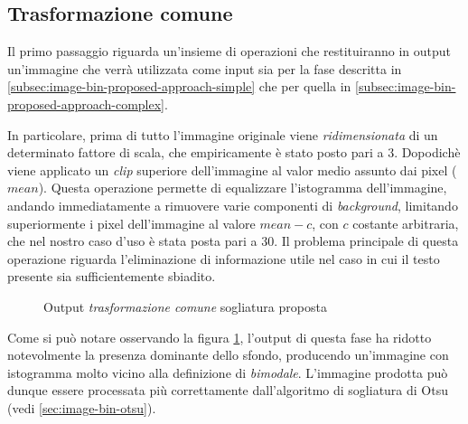 \subsection{Trasformazione comune}
\label{subsec:image-bin-proposed-approach-common}
Il primo passaggio riguarda un'insieme di operazioni che restituiranno in output un'immagine che verr\`a utilizzata come input sia per la fase descritta in \ref{subsec:image-bin-proposed-approach-simple} che per quella in \ref{subsec:image-bin-proposed-approach-complex}.\par
In particolare, prima di tutto l'immagine originale viene \textit{ridimensionata} di un determinato fattore di scala, che empiricamente \`e stato posto pari a $3$. Dopodich\`e viene applicato un \textit{clip} superiore dell'immagine al valor medio assunto dai pixel ($mean$). Questa operazione permette di equalizzare l'istogramma dell'immagine, andando immediatamente a rimuovere varie componenti di \textit{background}, limitando superiormente i pixel dell'immagine al valore $mean - c$, con $c$ costante arbitraria, che nel nostro caso d'uso \`e stata posta pari a $30$. Il problema principale di questa operazione riguarda l'eliminazione di informazione utile nel caso in cui il testo presente sia sufficientemente sbiadito.
\begin{figure}[h]
	\centering
	\caption{Output \textit{trasformazione comune} sogliatura proposta}
	\label{fig:image-bin-proposed-approach-common}
\end{figure}\par
Come si pu\`o notare osservando la figura \ref{fig:image-bin-proposed-approach-common}, l'output di questa fase ha ridotto notevolmente la presenza dominante dello sfondo, producendo un'immagine con istogramma molto vicino alla definizione di \textit{bimodale}. L'immagine prodotta pu\`o dunque essere processata pi\`u correttamente dall'algoritmo di sogliatura di Otsu (vedi \ref{sec:image-bin-otsu}).


